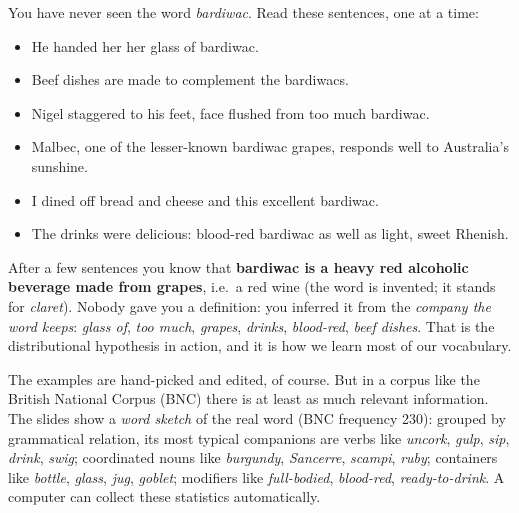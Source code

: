 You have never seen the word \emph{bardiwac}. Read these sentences, one at a time:
\begin{itemize}[nosep]
  \item He handed her her glass of bardiwac.
  \item Beef dishes are made to complement the bardiwacs.
  \item Nigel staggered to his feet, face flushed from too much bardiwac.
  \item Malbec, one of the lesser-known bardiwac grapes, responds well to Australia's
        sunshine.
  \item I dined off bread and cheese and this excellent bardiwac.
  \item The drinks were delicious: blood-red bardiwac as well as light, sweet Rhenish.
\end{itemize}

\begin{nbintuition}
After a few sentences you know that \textbf{bardiwac is a heavy red alcoholic beverage
made from grapes}, i.e.\ a red wine (the word is invented; it stands for
\emph{claret}). Nobody gave you a definition: you inferred it from the
\emph{company the word keeps}: \emph{glass of}, \emph{too much}, \emph{grapes},
\emph{drinks}, \emph{blood-red}, \emph{beef dishes}. That is the distributional hypothesis
in action, and it is how we learn most of our vocabulary.
\end{nbintuition}

The examples are hand-picked and edited, of course. But in a corpus like the British
National Corpus (BNC) there is at least as much relevant information. The slides show a
\emph{word sketch} of the real word (BNC frequency 230): grouped by grammatical relation,
its most typical companions are verbs like \emph{uncork}, \emph{gulp}, \emph{sip},
\emph{drink}, \emph{swig}; coordinated nouns like \emph{burgundy}, \emph{Sancerre},
\emph{scampi}, \emph{ruby}; containers like \emph{bottle}, \emph{glass}, \emph{jug},
\emph{goblet}; modifiers like \emph{full-bodied}, \emph{blood-red}, \emph{ready-to-drink}.
A computer can collect these statistics automatically.
